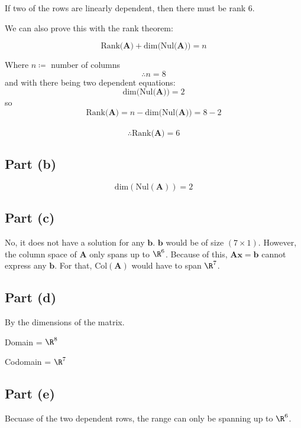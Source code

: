 \documentclass{article}
\begin{document}
If two of the rows are linearly dependent, then there must be rank 6.

We can also prove this with the rank theorem:

\[%
    \text{Rank(}\mathbf{A}) + \text{dim(Nul(}\mathbf{A})) = n
\]%

Where $ n \coloneqq  $ number of columns
\[%
    \therefore n=8
\]%
and with there being two dependent equations:
\[%
   \text{dim(Nul(}\mathbf{A})) = 2
\]%
so
\[%
    \text{Rank(}\mathbf{A})  = n  - \text{dim(Nul(}\mathbf{A})) = 8 - 2 
\]%
\\
\[%
    \therefore \text{Rank(}\mathbf{A}) = 6
\]%

\subsection{Part (b)} 
\[%
    \text{dim} (\text{Nul}(\mathbf{A})) = 2
\]%


\subsection{Part (c)} 
No, it does not have a solution for any $\mathbf{b}$. $\mathbf{b}$ would be of
size $(7 \times 1)$. However, the column space of $\mathbf{A}$ only spans up to
$\R^{6}$. Because of this, $\mathbf{A}\mathbf{x} = \mathbf{b}$ cannot express
any $\mathbf{b}$. For that, $\text{Col}(\mathbf{A})$ would have to span
$\R^{7}$.

\subsection{Part (d)} 
By the dimensions of the matrix.

Domain = $ \R^{8} $ 

Codomain = $ \R^{7} $

\subsection{Part (e)} 
Becuase of the two dependent rows, the range can only be spanning up to $ \R^{6} $.
\end{document}
